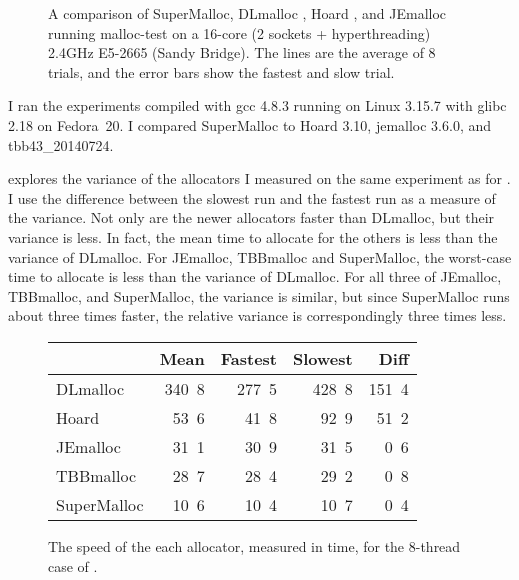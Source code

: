 \documentclass[natbib,sort&compress,10pt]{sigplanconf}
\newcommand{\ns}[1]{\unit{#1}\nano\second{}}
\begin{document}
\begin{figure}

\caption{A comparison of SuperMalloc, DLmalloc \cite{Lea96}, Hoard
  \cite{BergerMcBl00}, and JEmalloc~\cite{Evans06} running malloc-test
  on a 16-core (2 sockets + hyperthreading) 2.4GHz E5-2665 (Sandy
  Bridge).  The lines are the average of 8 trials, and the error bars
  show the fastest and slow trial.}
\label{fig:datalock}
\vspace*{-3ex}
\end{figure}

I ran the experiments compiled with gcc 4.8.3 running on Linux 3.15.7
with glibc 2.18 on Fedora~20.  I compared SuperMalloc to Hoard 3.10,
jemalloc 3.6.0, and tbb43\_20140724.

 explores the variance of the allocators I measured
on the same experiment as for .  I use the difference
between the slowest run and the fastest run as a measure of the
variance.  Not only are the newer allocators faster than DLmalloc, but
their variance is less.  In fact, the mean time to allocate for the
others is less than the variance of DLmalloc. For JEmalloc, TBBmalloc
and SuperMalloc, the worst-case time to allocate is less than the
variance of DLmalloc.  For all three of JEmalloc, TBBmalloc, and
SuperMalloc, the variance is similar, but since SuperMalloc runs about
three times faster, the relative variance is correspondingly three
times less.

\begin{figure}
\begin{center}
\begin{tabular}{l@{}rrrr}
            & Mean       & Fastest    & Slowest     & Diff       \\ \hline
DLmalloc    & \ns{340.8} & \ns{277.5} & \ns{428.8}  & \ns{151.4} \\
Hoard       & \ns{ 53.6} & \ns{ 41.8} & \ns{ 92.9}  & \ns{ 51.2} \\
JEmalloc    & \ns{ 31.1} & \ns{ 30.9} & \ns{ 31.5}  & \ns{  0.6} \\
TBBmalloc   & \ns{ 28.7} & \ns{ 28.4} & \ns{ 29.2}  & \ns{  0.8} \\
SuperMalloc & \ns{ 10.6} & \ns{ 10.4} & \ns{ 10.7}  & \ns{  0.4} \\
\end{tabular}
\end{center}
\caption{The speed of the each allocator, measured in time, for the
  8-thread case of .  }
\label{fig:variance}
\end{figure}
\end{document}
